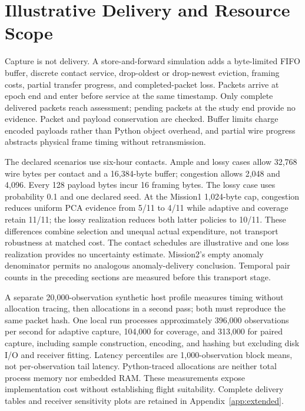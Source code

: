 \section{Illustrative Delivery and Resource Scope}
\label{sec:delivery}
Capture is not delivery. A store-and-forward simulation adds a byte-limited FIFO
buffer, discrete contact service, drop-oldest or drop-newest eviction, framing
costs, partial transfer progress, and completed-packet loss. Packets arrive at epoch
end and enter before service at the same timestamp. Only complete delivered packets
reach assessment; pending packets at the study end provide no evidence. Packet
and payload conservation are checked. Buffer limits charge encoded payloads rather
than Python object overhead, and partial wire progress abstracts physical frame
timing without retransmission.

The declared scenarios use six-hour contacts. Ample and lossy cases allow 32,768
wire bytes per contact and a 16,384-byte buffer; congestion allows 2,048 and 4,096.
Every 128 payload bytes incur 16 framing bytes. The lossy case uses probability
0.1 and one declared seed. At the Mission1 1,024-byte cap, congestion reduces
uniform PCA evidence from 5/11 to 4/11 while adaptive and coverage retain 11/11;
the lossy realization reduces both latter policies to 10/11. These differences
combine selection and unequal actual expenditure, not transport robustness at
matched cost. The contact schedules are illustrative and one loss realization
provides no uncertainty estimate. Mission2's empty anomaly denominator permits
no analogous anomaly-delivery conclusion. Temporal pair counts in the preceding
sections are measured before this transport stage.

A separate 20,000-observation synthetic host profile measures timing without
allocation tracing, then allocations in a second pass; both must reproduce the
same packet hash. One local run processes approximately 396,000 observations per
second for adaptive capture, 104,000 for coverage, and 313,000 for paired capture,
including sample construction, encoding, and hashing but excluding disk I/O and
receiver fitting. Latency percentiles are 1,000-observation block means, not
per-observation tail latency. Python-traced allocations are neither total process
memory nor embedded RAM. These measurements expose implementation cost without
establishing flight suitability. Complete delivery tables and receiver sensitivity
plots are retained in Appendix~\ref{app:extended}.
